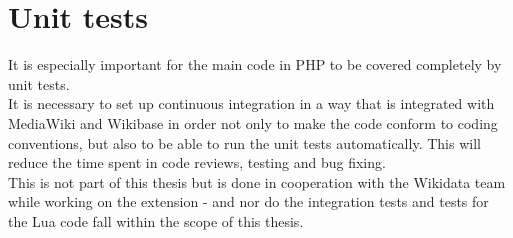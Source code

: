 \section {Unit tests}
It is especially important for the main code in PHP to be covered completely by unit tests. \\
It is necessary to set up continuous integration in a way that is integrated with MediaWiki and Wikibase in order not only to make the code conform to coding conventions, but also to be able to run the unit tests automatically. This will reduce the time spent in code reviews, testing and bug fixing. \\
This is not part of this thesis but is done in cooperation with the Wikidata team while working on the extension - and nor do the integration tests and tests for the Lua code fall within the scope of this thesis. \\ 